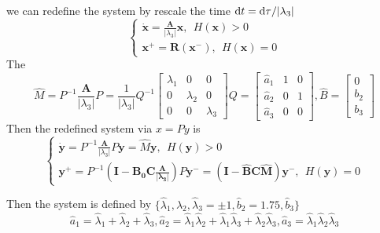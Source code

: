 \documentclass[a4paper,10pt]{article}
\begin{document}
we can redefine the system by rescale the time  ${\rm d} t = {\rm d} \tau / |\lambda_3|$
	\begin{equation}
	\begin{cases}
	\dot{\mathbf{x}} =\frac{\mathbf{A}}{|\lambda_3|}\mathbf{x} , ~~ H(\mathbf{x}) > 0 \\
	\mathbf{x}^+ = \mathbf{R}(\mathbf{x}^-), ~~ H(\mathbf{x}) = 0
	\end{cases}	
	\end{equation}
The \[ \hat{M} = P^{-1} \frac{\mathbf{A}}{|\lambda_3|} P = \frac{1}{|\lambda_3|}Q^{-1} \begin{bmatrix}
	\lambda_1 & 0 & 0\\ 0 & \lambda_2 & 0 \\ 0 & 0 & \lambda_3
\end{bmatrix} Q= \begin{bmatrix}
	\hat{a}_1 & 1 & 0\\ \hat{a}_2 & 0 & 1 \\ \hat{a}_3 & 0 & 0
\end{bmatrix}, \hat{B} = \begin{bmatrix}
	0\\b_2\\b_3
\end{bmatrix} \] 
Then the redefined system  via $x = Py$ is 
\begin{equation}
	\begin{cases}
		\dot{\mathbf{y}} =P^{-1} \frac{\mathbf{A}}{|\lambda_3|} P \mathbf{y} = \hat{M} \mathbf{y} , ~~ H(\mathbf{y}) > 0 \\
		\mathbf{y}^+ = P^{-1} \mathbf{(I - B_0 C \frac{\mathbf{A}}{|\lambda_3|} )}  P \mathbf{y}^- =\mathbf{(I - \hat{B} C \hat{M}) }\mathbf{y}^- , ~~ H(\mathbf{y}) = 0
	\end{cases}	
\end{equation}
	
Then the system is defined by $\{ \hat{\lambda}_1, \hat{\lambda}_2,  \hat{\lambda}_3= \pm 1, \hat{b}_2 = 1.75, \hat{b}_3 \}$
\[\hat{a}_1 = \hat{\lambda}_1+\hat{\lambda}_2+\hat{\lambda}_3, \hat{a}_2 = \hat{\lambda}_1 \hat{\lambda}_2 + \hat{\lambda}_1 \hat{\lambda}_3 + \hat{\lambda}_2 \hat{\lambda}_3, \hat{a}_3 = \hat{\lambda}_1 \hat{\lambda}_2 \hat{\lambda}_3\]
\end{document}
